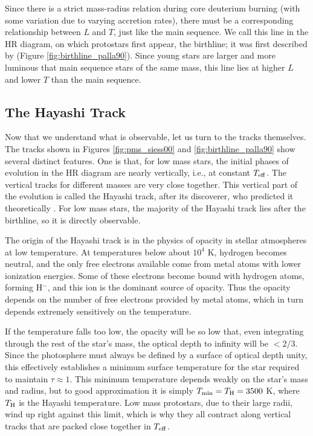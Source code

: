 Since there is a strict mass-radius relation during core deuterium burning (with some variation due to varying accretion rates), there must be a corresponding relationship between $L$ and $T$, just like the main sequence. We call this line in the HR diagram, on which protostars first appear, the birthline; it was first described by \citet{palla90a} (Figure \ref{fig:birthline_palla90}). Since young stars are larger and more luminous that main sequence stars of the same mass, this line lies at higher $L$ and lower $T$ than the main sequence.

\subsection{The Hayashi Track}

Now that we understand what is observable, let us turn to the tracks themselves. The tracks shown in Figures \ref{fig:pms_siess00} and \ref{fig:birthline_palla90} show several distinct features. One is that, for low mass stars, the initial phases of evolution in the HR diagram are nearly vertically, i.e., at constant $T_{\rm eff}$. The vertical tracks for different masses are very close together. This vertical part of the evolution is called the Hayashi track, after its discoverer, who predicted it theoretically \citep{hayashi61a}. For low mass stars, the majority of the Hayashi track lies after the birthline, so it is directly observable.

The origin of the Hayashi track is in the physics of opacity in stellar atmospheres at low temperature. At temperatures below about $10^4$ K, hydrogen becomes neutral, and the only free electrons available come from metal atoms with lower ionization energies. Some of these electrons become bound with hydrogen atoms, forming H$^-$, and this ion is the dominant source of opacity.  Thus the opacity depends on the number of free electrons provided by metal atoms, which in turn depends extremely sensitively on the temperature.

If the temperature falls too low, the opacity will be so low that, even integrating through the rest of the star's mass, the optical depth to infinity will be $<2/3$. Since the photosphere must always be defined by a surface of optical depth unity, this effectively establishes a minimum surface temperature for the star required to maintain $\tau \approx 1$. This minimum temperature depends weakly on the star's mass and radius, but to good approximation it is simply $T_{\rm min} = T_{\rm H} = 3500$ K, where $T_{\rm H}$ is the Hayashi temperature. Low mass protostars, due to their large radii, wind up right against this limit, which is why they all contract along vertical tracks that are packed close together in $T_{\rm eff}$.

